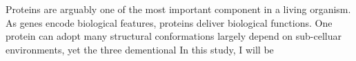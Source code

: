Proteins are arguably one of the most important component in a living organism. As genes encode biological features, proteins deliver biological functions. One protein can adopt many structural conformations largely depend on sub-celluar environments, yet the three dementional      In this study, I will be 